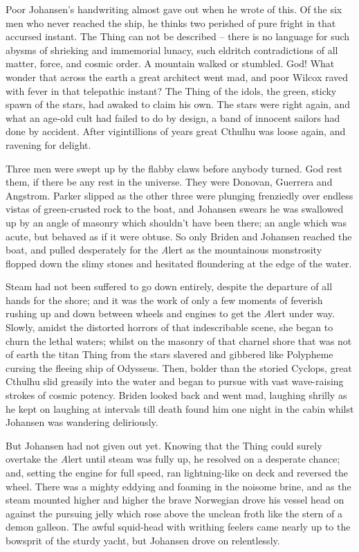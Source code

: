 Poor Johansen’s handwriting almost gave out when he wrote of this. Of the six men who never reached the ship, he thinks two perished of pure fright in that accursed instant. The Thing can not be described⁠ – there is no language for such abysms of shrieking and immemorial lunacy, such eldritch contradictions of all matter, force, and cosmic order. A mountain walked or stumbled. God! What wonder that across the earth a great architect went mad, and poor Wilcox raved with fever in that telepathic instant? The Thing of the idols, the green, sticky spawn of the stars, had awaked to claim his own. The stars were right again, and what an age-old cult had failed to do by design, a band of innocent sailors had done by accident. After vigintillions of years great Cthulhu was loose again, and ravening for delight.

Three men were swept up by the flabby claws before anybody turned. God rest them, if there be any rest in the universe. They were Donovan, Guerrera and Angstrom. Parker slipped as the other three were plunging frenziedly over endless vistas of green-crusted rock to the boat, and Johansen swears he was swallowed up by an angle of masonry which shouldn’t have been there; an angle which was acute, but behaved as if it were obtuse. So only Briden and Johansen reached the boat, and pulled desperately for the {\emph Alert} as the mountainous monstrosity flopped down the slimy stones and hesitated floundering at the edge of the water.

Steam had not been suffered to go down entirely, despite the departure of all hands for the shore; and it was the work of only a few moments of feverish rushing up and down between wheels and engines to get the {\emph Alert} under way. Slowly, amidst the distorted horrors of that indescribable scene, she began to churn the lethal waters; whilst on the masonry of that charnel shore that was not of earth the titan Thing from the stars slavered and gibbered like Polypheme cursing the fleeing ship of Odysseus. Then, bolder than the storied Cyclops, great Cthulhu slid greasily into the water and began to pursue with vast wave-raising strokes of cosmic potency. Briden looked back and went mad, laughing shrilly as he kept on laughing at intervals till death found him one night in the cabin whilst Johansen was wandering deliriously.

But Johansen had not given out yet. Knowing that the Thing could surely overtake the {\emph Alert} until steam was fully up, he resolved on a desperate chance; and, setting the engine for full speed, ran lightning-like on deck and reversed the wheel. There was a mighty eddying and foaming in the noisome brine, and as the steam mounted higher and higher the brave Norwegian drove his vessel head on against the pursuing jelly which rose above the unclean froth like the stern of a demon galleon. The awful squid-head with writhing feelers came nearly up to the bowsprit of the sturdy yacht, but Johansen drove on relentlessly.

